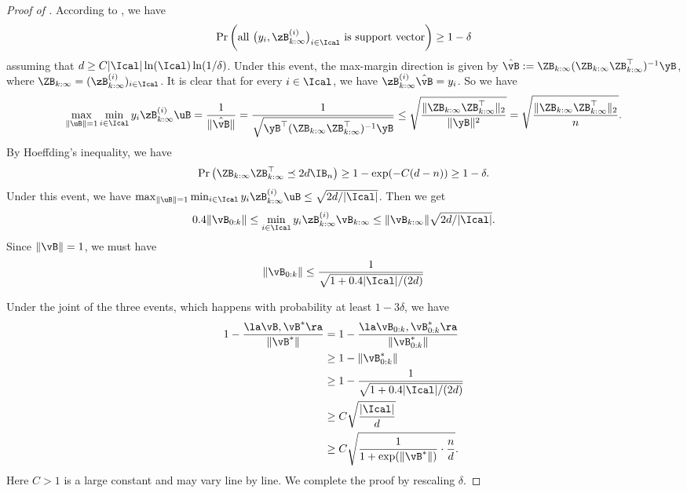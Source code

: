 \documentclass[11pt]{article}
\begin{document}
\begin{proof}[Proof of ]
According to \citep{hsu2021proliferation}, we have 
\begin{align*}
    \Pr\bigg(\text{all $\big(y_i, \zB^{(i)}_{k:\infty}\big)_{i \in\Ical}$ is support vector} \bigg) \ge 1-\delta
\end{align*}
assuming that $d\ge C |\Ical|\ln(\Ical) \ln(1/\delta)$.
Under this event, the max-margin direction is given by $ \hat \vB := \ZB_{k:\infty} (\ZB_{k:\infty} \ZB_{k:\infty}^\top)^{-1} \yB$, where $\ZB_{k:\infty} = (\zB^{(i)}_{k:\infty})_{i\in\Ical}$. It is clear that for every $i\in\Ical$, we have $ \zB^{(i)}_{k:\infty} \hat \vB = y_i$.
So we have 
\begin{align*}
    \max_{\|\uB\|=1 }\min_{i\in\Ical} y_i \zB^{(i)}_{k:\infty} \uB 
= \frac{1}{\|\hat \vB\|} 
    = \frac{1}{\sqrt{ \yB^\top (\ZB_{k:\infty} \ZB_{k:\infty}^\top)^{-1} \yB }} 
    \le \sqrt{\frac{\|\ZB_{k:\infty} \ZB_{k:\infty}^\top\|_2}{\|\yB\|^2}} 
    =  \sqrt{\frac{\|\ZB_{k:\infty} \ZB_{k:\infty}^\top\|_2 }{n}}.
\end{align*}
By Hoeffding's inequality, we have 
\begin{align*}
    \Pr\big(\ZB_{k:\infty} \ZB_{k:\infty}^\top \preceq 2 d \IB_n  \big) \ge 1- \exp(-C (d-n)) \ge 1-\delta.
\end{align*}
Under this event, we have $ \max_{\|\uB\|=1 }\min_{i\in\Ical} y_i \zB^{(i)}_{k:\infty} \uB \le \sqrt{2d/|\Ical|}$.
Then we get
\begin{align*}
    0.4 \|\vB_{0:k}\| \le \min_{i\in\Ical} y_i\zB^{(i)}_{k:\infty} \vB_{k:\infty} \le \|\vB_{k:\infty}\|\sqrt{2d/|\Ical|}.
\end{align*}
Since $\|\vB\|=1$, we must have 
\begin{align*}
    \|\vB_{0:k}\| \le \frac{1}{\sqrt{1+0.4 |\Ical|/(2d)}}
\end{align*}

Under the joint of the three events, which happens with probability at least $1-3\delta$, we have
\begin{align*}
    1- \frac{\la \vB, \vB^*\ra }{\|\vB^*\|}
    &= 1- \frac{\la \vB_{0:k}, \vB^*_{0:k}\ra }{\|\vB^*_{0:k}\|} \\ 
    &\ge  1- \|\vB^*_{0:k}\| \\
    &\ge  1- \frac{1}{\sqrt{1+0.4 |\Ical|/(2d)}} \\
    &\ge C \sqrt{\frac{|\Ical|}{d}} \\
    &\ge C \sqrt{ \frac{1}{1+\exp(\|\vB^*\|)} \cdot \frac{n}{d}}.
\end{align*}
Here $C>1$ is a large constant and may vary line by line. We complete the proof by rescaling $\delta$.
\end{proof}
\end{document}
